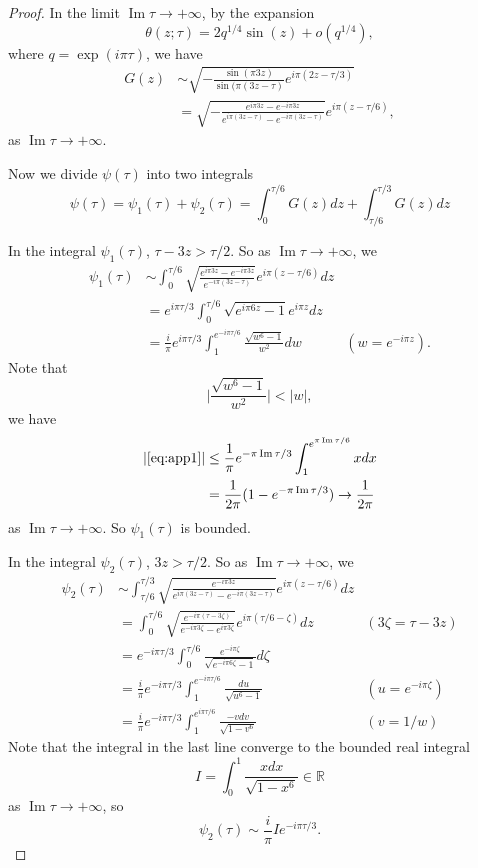 \documentclass[10pt,a4paper]{amsart}
\newcommand{\im}{\operatorname{Im}}
\begin{document}
\begin{proof}
	In the limit $\im\tau \to +\infty$, by the expansion~\cite[(20.2.1)]{DLMF}
	\[
		\theta(z;\tau) = 2 q^{1/4} \sin(z) + o(q^{1/4}),
	\]
	where $q = \exp(i \pi \tau)$, we have
	\begin{align*}
		G(z)
		&\sim
		\sqrt{-\frac{\sin(\pi 3z)}{\sin(\pi (3z - \tau)} e^{i \pi (2z - \tau/3)}}\\
			&= \sqrt{-\frac{e^{i \pi 3z} - e^{-i \pi 3z}}{e^{i \pi (3z - \tau)} - e^{-i \pi (3z - \tau)}}} e^{i \pi (z - \tau/6)},
		\end{align*}
		as $\im\tau \to +\infty$.

		Now we divide $\psi(\tau)$ into two integrals
		\[
			\psi(\tau) = \psi_1(\tau) + \psi_2(\tau) = \int_0^{\tau/6} G(z) dz + \int_{\tau/6}^{\tau/3} G(z) dz
		\]

		In the integral $\psi_1(\tau)$, $\tau - 3z > \tau/2$.  So as $\im \tau \to +\infty$, we 
		\begin{align}
			\psi_1(\tau)
			&\sim \int_0^{\tau/6} \sqrt{\frac{e^{i \pi 3z} - e^{-i \pi 3z}}{e^{-i \pi (3z - \tau)}}} e^{i \pi (z - \tau/6)} dz\nonumber\\
			&= e^{i \pi \tau/3} \int_0^{\tau/6} \sqrt{e^{i \pi 6z} - 1} e^{i \pi z} dz\nonumber\\
			&= \frac{i}{\pi} e^{i \pi \tau/3} \int_1^{e^{-i\pi\tau/6}} \frac{\sqrt{w^6-1}}{w^2} dw  & (w = e^{-i\pi z}).\label{eq:app1}
		\end{align}
		Note that
		\[
			\Big| \frac{\sqrt{w^6-1}}{w^2} \Big| < |w|,
		\]
		we have
		\begin{align*}
			| \text{\eqref{eq:app1}} |
			&\le \frac{1}{\pi} e^{-\pi \im\tau/3} \int_1^{e^{\pi\im\tau/6}} x dx \\
			& = \frac{1}{2\pi} (1 - e^{-\pi\im\tau/3}) \to \frac{1}{2\pi}
		\end{align*}
		as $\im\tau \to +\infty$.  So $\psi_1(\tau)$ is bounded.

		In the integral $\psi_2(\tau)$, $3z > \tau/2$.  So as $\im \tau \to +\infty$, we 
		\begin{align*}
			\psi_2(\tau)
			&\sim \int_{\tau/6}^{\tau/3} \sqrt{\frac{e^{-i \pi 3z}}{e^{i \pi (3z - \tau)} - e^{-i \pi (3z - \tau)}}} e^{i \pi (z - \tau/6)} dz\\
			&= \int_{0}^{\tau/6} \sqrt{\frac{e^{-i \pi (\tau - 3\zeta)}}{e^{- i \pi 3\zeta} - e^{i \pi 3\zeta}}} e^{i \pi (\tau/6 - \zeta)} dz & (3\zeta = \tau - 3z)\\
			&= e^{-i \pi \tau/3} \int_0^{\tau/6} \frac{e^{-i\pi \zeta}}{\sqrt{e^{-i\pi 6\zeta} -1}} d\zeta\\
			&= \frac{i}{\pi} e^{-i \pi \tau/3} \int_1^{e^{-i\pi \tau/6}} \frac{du}{\sqrt{u^6 -1}} & (u = e^{-i \pi \zeta})\\
			&= \frac{i}{\pi} e^{-i \pi \tau/3} \int_1^{e^{i\pi \tau/6}} \frac{-v dv}{\sqrt{1 - v^6}} & (v = 1/w)
		\end{align*}
		Note that the integral in the last line converge to the bounded real integral
		\[
			I = \int_0^1 \frac{x dx}{\sqrt{1 - x^6}} \in \mathbb{R}
		\]
		as $\im\tau \to +\infty$, so
		\[
			\psi_2(\tau) \sim \frac{i}{\pi} I e^{-i\pi \tau/3}.
		\]


\end{proof}
\end{document}
